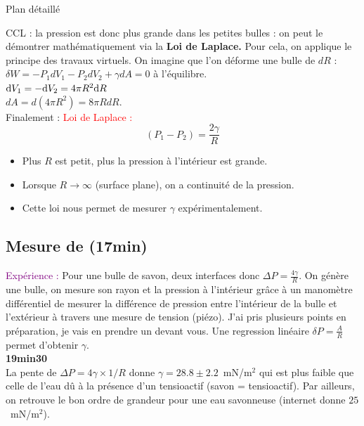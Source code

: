 \begin{reportBlock}{Plan détaillé}
\begin{center}
 \end{center}
 CCL : la pression est donc plus grande dans les petites bulles : on peut le démontrer mathématiquement via la \textbf{Loi de Laplace.}
 Pour cela, on applique le principe des travaux virtuels. On imagine que l'on déforme une bulle de $dR$ : \\
 $\delta W = -P_1dV_1-P_2dV_2+\gamma dA =0$ à l'équilibre.\\
 $\mathrm{d} V_1 = - \mathrm{d} V_2 = 4 \pi R^2 \mathrm{d} R$\\
 $dA = d(4\pi R^2) = 8\pi RdR$.\\
 Finalement : 
 \textcolor{red}{Loi de Laplace : }
 \begin{equation}
     (P_1-P_2)=\frac{2\gamma}{R}
 \end{equation}
 \begin{itemize}
     \item Plus $R$ est petit, plus la pression à l'intérieur est grande. 
     \item Lorsque $R \rightarrow \infty$ (surface plane), on a continuité de la pression.
     \item Cette loi nous permet de mesurer $\gamma$ expérimentalement.
 \end{itemize}
 \subsection{Mesure de \text{$\gamma$} (17min)}
 \textcolor{purple}{Expérience :}  Pour une bulle de savon, deux interfaces donc $\Delta P =\frac{4\gamma}{R}$. On génère une bulle, on mesure son rayon et la pression à l'intérieur grâce à un manomètre différentiel de mesurer la différence de pression entre l'intérieur de la bulle et l'extérieur à travers une mesure de tension (piézo). J'ai pris plusieurs points en préparation, je vais en prendre un devant vous. Une regression linéaire $\delta P = \frac{A}{R}$ permet d'obtenir $\gamma$. \\
 \textbf{19min30}\\

La pente de $\Delta P = 4 \gamma\times 1/R$ donne $\gamma=28.8 \pm 2.2$~mN/m$^2$ qui est plus faible que celle de l'eau dû à la présence d'un tensioactif (savon = tensioactif). Par ailleurs, on retrouve le bon ordre de grandeur pour une eau savonneuse (internet donne $25$~mN/m$^2$). \\



\end{reportBlock}
